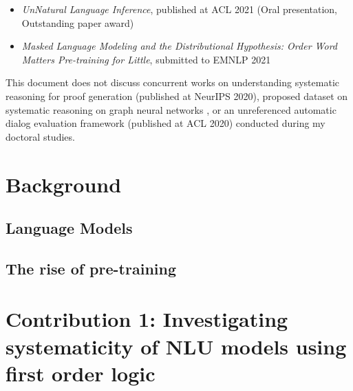 \documentclass[12pt]{article}
\begin{document}
\begin{itemize}
  \item \textit{UnNatural Language Inference}, published at ACL 2021 (Oral presentation, Outstanding paper award) \cite{sinha2021}
  \item \textit{Masked Language Modeling and the Distributional Hypothesis: Order Word Matters Pre-training for Little}, submitted to EMNLP 2021 \cite{sinha2021a}
\end{itemize}

This document does not discuss concurrent works on understanding systematic reasoning for proof generation \cite{gontier2020} (published at NeurIPS 2020), proposed dataset on systematic reasoning on graph neural networks \cite{sinha2020c}, or an unreferenced automatic dialog evaluation framework \cite{sinha2020d} (published at ACL 2020) conducted during my doctoral studies.






\section{Background}


\subsection{Language Models}



\subsection{The rise of pre-training}

\section{Contribution 1: Investigating systematicity of NLU models using first order logic}
\end{document}
